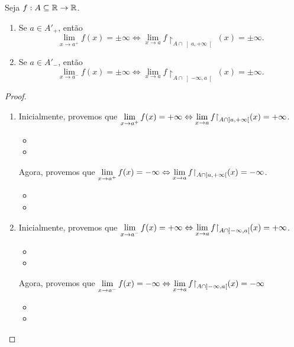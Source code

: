 \begin{proposition}
    Seja $f : A \subseteq \mathbb{R} \to \mathbb{R}$.
        \begin{enumerate}[leftmargin=*, align=left, label=\textbf{(\alph*)}]
            \item Se $a \in A'_+$, então
                \[
                    \lim_{x \to a^+} f(x) = \pm \infty \Leftrightarrow \lim_{x \to a} f \restriction_{A \cap \left]a,+\infty \right[ } (x) = \pm \infty.
                \]
            \item Se $a \in A'_-$, então
                \[
                    \lim_{x \to a^-} f(x) = \pm \infty \Leftrightarrow \lim_{x \to a} f \restriction_{A \cap \left]-\infty, a \right[ } (x) = \pm \infty.
                \]
        \end{enumerate}
\end{proposition}

\begin{proof}
    \leavevmode
        \begin{enumerate}[leftmargin=*, align=left, label=\textbf{(\alph*)}]
            \item Inicialmente, provemos que $\ds \lim_{x \to a^+} f(x) = + \infty \Leftrightarrow \lim_{x \to a} f \restriction_{A \cap \left]a,+\infty \right[ } (x) = + \infty$.
                \begin{itemize}
                    \item[($\Rightarrow$)]
                    \item[($\Leftarrow$)]  
                \end{itemize}
            Agora, provemos que $\ds \lim_{x \to a^+} f(x) = - \infty \Leftrightarrow \lim_{x \to a} f \restriction_{A \cap \left]a,+\infty \right[ } (x) = - \infty$.
                \begin{itemize}
                    \item[($\Rightarrow$)]
                    \item[($\Leftarrow$)]  
                \end{itemize}
            \blackproof
            \item Inicialmente, provemos que $\ds \lim_{x \to a^-} f(x) = + \infty \Leftrightarrow \lim_{x \to a} f \restriction_{A \cap \left]-\infty, a \right[ } (x) = + \infty$.
                \begin{itemize}
                    \item[($\Rightarrow$)]
                    \item[($\Leftarrow$)]  
                \end{itemize}
            Agora, provemos que $\ds \lim_{x \to a^-} f(x) = - \infty \Leftrightarrow \lim_{x \to a} f \restriction_{A \cap \left]-\infty, a \right[ } (x) = - \infty$
                \begin{itemize}
                    \item[($\Rightarrow$)]
                    \item[($\Leftarrow$)]  
                \end{itemize}
            \blackproof
        \end{enumerate}
\end{proof}

